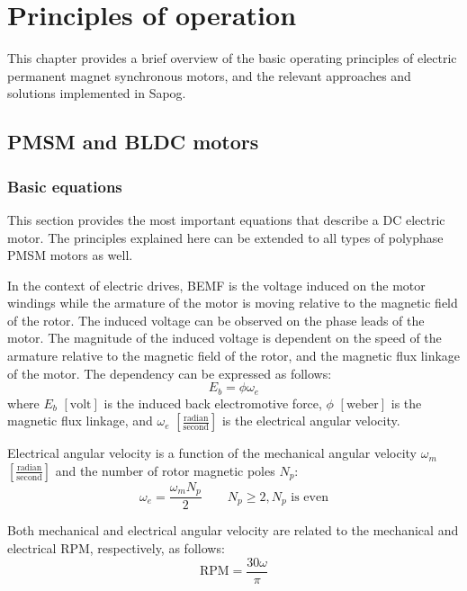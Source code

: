 \documentclass{zubaxdoc}
\begin{document}
\chapter{Principles of operation}

This chapter provides a brief overview of the basic operating principles of electric permanent magnet
synchronous motors, and the relevant approaches and solutions implemented in Sapog.

\section{PMSM and BLDC motors}

\subsection{Basic equations}\label{sec:motor_equations}

This section provides the most important equations that describe a DC electric motor.
The principles explained here can be extended to all types of polyphase PMSM motors as well.

In the context of electric drives, BEMF is the voltage induced on the motor windings
while the armature of the motor is moving relative to the magnetic field of the rotor.
The induced voltage can be observed on the phase leads of the motor.
The magnitude of the induced voltage is dependent on the speed of the armature relative to the magnetic field
of the rotor, and the magnetic flux linkage of the motor. The dependency can be expressed as follows:
\begin{equation}
E_b = \phi \omega_e
\end{equation}
where $E_b$ $\left[\text{volt}\right]$ is the induced back electromotive force,
$\phi$ $\left[\text{weber}\right]$ is the magnetic flux linkage,
and $\omega_e$ $\left[\frac{\text{radian}}{\text{second}}\right]$ is the electrical angular velocity.

Electrical angular velocity is a function of the mechanical angular velocity
$\omega_m$ $\left[\frac{\text{radian}}{\text{second}}\right]$
and the number of rotor magnetic poles $N_p$:
\begin{equation}\label{eq:speed_electrical_mechanical}
\omega_e = \frac{\omega_m N_p}{2}\qquad
N_p \geq 2, N_p\text{\ is even}
\end{equation}

Both mechanical and electrical angular velocity are related to the mechanical and electrical RPM,
respectively, as follows:
\begin{equation}
\text{RPM} = \frac{30 \omega }{\pi }
\end{equation}
\end{document}
